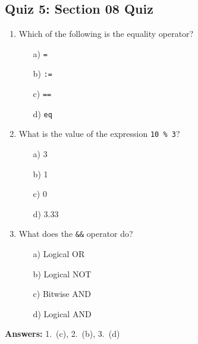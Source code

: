 \subsection{Quiz 5: Section 08 Quiz}
\begin{enumerate}
	\item Which of the following is the equality operator?
	\begin{enumerate}
		\item[a)] \texttt{=}
		\item[b)] \texttt{:=}
		\item[c)] \texttt{==}
		\item[d)] \texttt{eq}
	\end{enumerate}

	\item What is the value of the expression \texttt{10 \% 3}?
	\begin{enumerate}
		\item[a)] 3
		\item[b)] 1
		\item[c)] 0
		\item[d)] 3.33
	\end{enumerate}

	\item What does the \texttt{\&\&} operator do?
	\begin{enumerate}
		\item[a)] Logical OR
		\item[b)] Logical NOT
		\item[c)] Bitwise AND
		\item[d)] Logical AND
	\end{enumerate}
\end{enumerate}

\textbf{Answers:} 1.\ (c), 2.\ (b), 3.\ (d)
